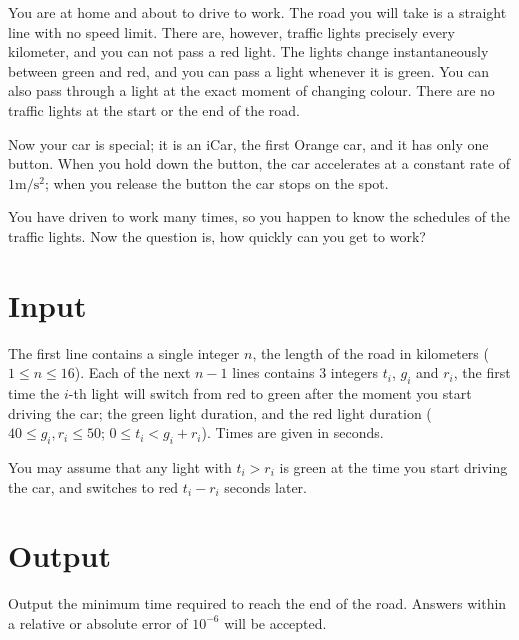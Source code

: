 

You are at home and about to drive to work. The road you will take is a straight
line with no speed limit. There are, however, traffic lights precisely
every kilometer, and you can not pass a red light. The lights change instantaneously
between green and red, and you can pass a light whenever it is green.
You can also pass through a light at the exact moment of changing colour.
There are no traffic lights at the start or the end of the road.

Now your car is special; it is an iCar, the first Orange car, and it has
only one button. When you hold down the button, the car accelerates at
a constant rate of $1 \mathrm{m}/\mathrm{s}^2$; when you release the
button the car stops on the spot.

You have driven to work many times, so you happen to know the schedules
of the traffic lights. Now the question is, how quickly can you get
to work?

\section*{Input}
The first line contains a single integer $n$, the length of the road
in kilometers ($1 \leq n \leq 16$). Each of the next $n-1$ lines
contains $3$ integers $t_i$, $g_i$ and $r_i$, the first time the $i$-th
light will switch from red to green after the moment you start driving the car; the green light duration, and
the red light duration ($40\leq g_i,r_i\leq 50$; $0 \leq t_i <
g_i+r_i$). Times are given in seconds.

You may assume that any light with $t_i > r_i$ is green at the time you start driving the car, and
switches to red $t_i - r_i$ seconds later.

\section*{Output}
Output the minimum time required to reach the end of the road.
Answers within a relative or absolute error of $10^{-6}$ will be accepted.
